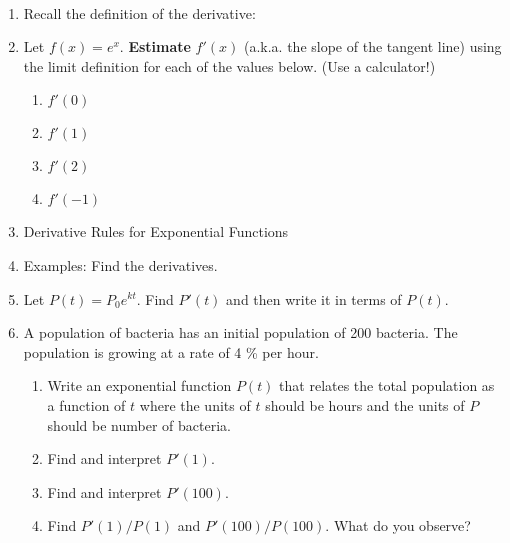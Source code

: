 \documentclass[11pt,fleqn]{article}
\begin{document}
\renewcommand{\headrulewidth}{0pt}
\newcommand{\blank}[1]{\rule{#1}{0.75pt}}
\newcommand{\bc}{\begin{center}}
\newcommand{\ec}{\end{center}}
\renewcommand{\d}{\displaystyle}

\vspace*{-0.7in}

\begin{center}
  \large
  \\
\end{center}
\begin{enumerate}
\item Recall the definition of the derivative:\\
\vspace{1in}
\item Let $f(x)=e^x.$ \textbf{Estimate} $f'(x)$ (a.k.a. the slope of the tangent line) using the limit definition for each of the values below. (Use a calculator!)
\begin{enumerate}
	\item $f'(0)$
	\vfill
	\item $f'(1)$
	\vfill
	\item $f'(2)$
	\vfill
	\item $f'(-1)$
	\vfill
\end{enumerate}
\item Derivative Rules for Exponential Functions	
\vspace{1.5in}
\newpage
\item Examples: Find the derivatives.

	\begin{enumerate}
	\begin{multicols}{2}
	\item $y=x^4e^x$
	\vfill
	\item $y=e^{x^2}$
	\vfill
	\end{multicols}
	\vfill
	\begin{multicols}{2}
	\item $y=5^{-x}$
	\vfill
	\item $f(x)=x^5+5^x$
	\vfill
	\end{multicols}
	\vfill
	\end{enumerate}
\item Let $P(t)=P_0e^{kt}$. Find $P'(t)$ and then write it in terms of $P(t).$
\vfill
\item A population of bacteria has an initial population of 200 bacteria. The population is growing at a rate of 4 \% per hour.
	\begin{enumerate}
	\item Write an exponential function $P(t)$ that relates the total population as a function of $t$ where the units of $t$ should be hours and the units of $P$ should be number of bacteria.
	\vfill
	\item Find and interpret $P'(1).$
	\vfill
	\item Find and interpret $P'(100).$
	\vfill
	\item Find $P'(1)/P(1)$ and $P'(100)/P(100).$ What do you observe?
	\vfill
	\end{enumerate}
\end{enumerate}
\end{document}

